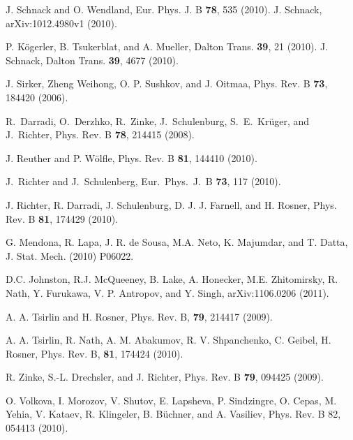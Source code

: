 \documentclass[aps,twocolumn,groupedaddress]{revtex4}
\begin{document}
\begin{thebibliography}{10}
 J. Schnack and O. Wendland,
Eur. Phys. J. B {\bf 78}, 535 (2010).
 J. Schnack, arXiv:1012.4980v1 (2010).



P. K\"ogerler, B. Tsukerblat, and A. Mueller,
Dalton Trans. {\bf 39}, 21 (2010).
J. Schnack, Dalton Trans. {\bf 39}, 4677 (2010).




J. Sirker, Zheng Weihong, O. P. Sushkov, and J. Oitmaa,
Phys. Rev. B {\bf 73}, 184420 (2006).

R.~Darradi, O.~Derzhko, R.~Zinke, J.~Schulenburg, S.~E.~Kr\"uger, and J.~Richter,
       Phys. Rev. B {\bf 78}, 214415 (2008).

 J. Reuther and P. W\"olfle,  Phys. Rev. B {\bf 81}, 144410
(2010).

J.~Richter and J.~Schulenberg,
Eur.~Phys.~J.~B {\bf 73}, 117 (2010).

J. Richter, R. Darradi, J. Schulenburg, D. J. J. Farnell, and H. Rosner,
Phys. Rev. B {\bf 81}, 174429 (2010).

   G. Mendona, R. Lapa, J. R. de Sousa, M.A. Neto, K. Majumdar, and T.
Datta,
J. Stat. Mech. (2010) P06022.

   D.C. Johnston, R.J. McQueeney, B. Lake, A. Honecker, M.E. Zhitomirsky,
            R. Nath,  Y. Furukawa, V. P. Antropov, and Y. Singh,
arXiv:1106.0206 (2011).




 A. A. Tsirlin and H. Rosner,  Phys. Rev. B, {\bf 79},
214417 (2009).

 A. A. Tsirlin, R. Nath, A. M. Abakumov, R. V.
Shpanchenko, C. Geibel, H. Rosner,  Phys. Rev. B, {\bf 81}, 174424 (2010).



  R. Zinke,  S.-L. Drechsler, and J. Richter,
       Phys. Rev. B {\bf 79}, 094425 (2009).


 O. Volkova, I. Morozov, V. Shutov, E. Lapsheva, P. Sindzingre, O. Cepas, M.
Yehia, V. Kataev, R. Klingeler, B. B\"uchner, and A. Vasiliev,
Phys. Rev. B 82, 054413 (2010).


\end{thebibliography}
\end{document}
